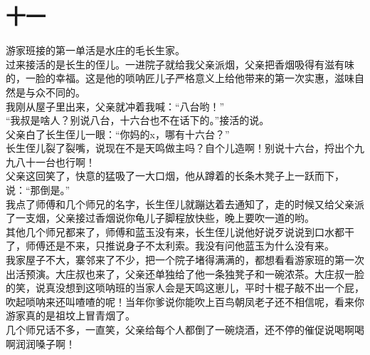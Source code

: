 \fancyhead[RO]{\thepage} %
\fancyhead[LE]{\thepage} %
\fancyfoot[LE,RO]{}
\fancyfoot[LO,CE]{}
\fancyfoot[CO,RE]{}
\chapter*{十一}
游家班接的第一单活是水庄的毛长生家。\\

过来接活的是长生的侄儿。一进院子就给我父亲派烟，父亲把香烟吸得有滋有味的，一脸的幸福。这是他的唢呐匠儿子严格意义上给他带来的第一次实惠，滋味自然是与众不同的。\\

我刚从屋子里出来，父亲就冲着我喊：“八台哟！”\\

“我叔是啥人？别说八台，十六台也不在话下的。”接活的说。\\

父亲白了长生侄儿一眼：“你妈的x，哪有十六台？”\\

长生侄儿裂了裂嘴，说现在不是天鸣做主吗？自个儿造啊！别说十六台，捋出个九九八十一台也行啊！\\

父亲这回笑了，快意的猛吸了一大口烟，他从蹲着的长条木凳子上一跃而下，说：“那倒是。”\\

我点了师傅和几个师兄的名字，长生侄儿就蹦达着去通知了，走的时候又给父亲派了一支烟，父亲接过香烟说你龟儿子脚程放快些，晚上要吹一道的哟。\\

其他几个师兄都来了，师傅和蓝玉没有来，长生侄儿说他好说歹说说到口水都干了，师傅还是不来，只推说身子不太利索。我没有问他蓝玉为什么没有来。\\

我家屋子不大，寨邻来了不少，把一个院子堵得满满的，都想看看游家班的第一次出活预演。大庄叔也来了，父亲还单独给了他一条独凳子和一碗浓茶。大庄叔一脸的笑，说真没想到这唢呐班的当家人会是天鸣这崽儿，平时十棍子敲不出一个屁，吹起唢呐来还叫喳喳的呢！当年你爹说你能吹上百鸟朝凤老子还不相信呢，看来你游家真的是祖坟上冒青烟了。\\

几个师兄话不多，一直笑，父亲给每个人都倒了一碗烧酒，还不停的催促说喝啊喝啊润润嗓子啊！\\

